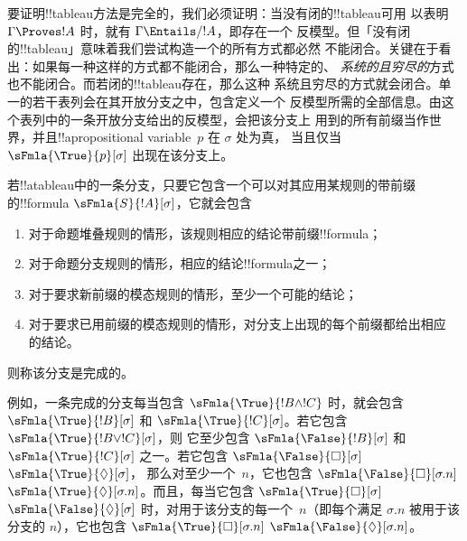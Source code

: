 \documentclass[../../../include/open-logic-section]{subfiles}
\begin{document}


\begin{explain}
  要证明!!{tableau}方法是完全的，我们必须证明：当没有闭的!!{tableau}可用
  以表明 $\Gamma \Proves !A$ 时，就有 $\Gamma \Entails/ !A$，即存在一个
  反模型。但「没有闭的!!{tableau}」意味着我们尝试构造一个的所有方式都必然
  不能闭合。关键在于看出：如果每一种这样的方式都不能闭合，那么一种特定的、
  \emph{系统的且穷尽的}方式也不能闭合。而若闭的!!{tableau}存在，那么这种
  系统且穷尽的方式就会闭合。单一的若干表列会在其开放分支之中，包含定义一个
  反模型所需的全部信息。由这个表列中的一条开放分支给出的反模型，会把该分支上
  用到的所有前缀当作世界，并且!!a{propositional variable}~$p$ 在 $\sigma$ 处为真，
  当且仅当 $\sFmla{\True}{p}[\sigma]$ 出现在该分支上。
\end{explain}

\begin{defn}
  若!!a{tableau}中的一条分支，只要它包含一个可以对其应用某规则的带前缀的!!{formula} $\sFmla{S}{!A}[\sigma]$，它就会包含
  \begin{enumerate}
    \item 对于命题堆叠规则的情形，该规则相应的结论带前缀!!{formula}；
    \item 对于命题分支规则的情形，相应的结论!!{formula}之一；
    \item 对于要求新前缀的模态规则的情形，至少一个可能的结论；
    \item 对于要求已用前缀的模态规则的情形，对分支上出现的每个前缀都给出相应
      的结论。
  \end{enumerate}
  则称该分支是完成的。
\end{defn}

\begin{explain}
  例如，一条完成的分支每当包含 $\sFmla{\True}{!B
  \land !C}$ 时，就会包含 $\sFmla{\True}{!B}[\sigma]$
  和 $\sFmla{\True}{!C}[\sigma]$。若它包含 $\sFmla{\True}{!B \lor !C}[\sigma]$，则
  它至少包含 $\sFmla{\False}{!B}[\sigma]$ 和
  $\sFmla{\True}{!C}[\sigma]$ 之一。若它包含 
  {$\sFmla{\False}{\Box}[\sigma]$} {$\sFmla{\True}{\Diamond}[\sigma]$}，
  那么对至少一个~$n$，它也包含  {$\sFmla{\False}{\Box}[\sigma.n]$}
  {$\sFmla{\True}{\Diamond}[\sigma.n]$}。而且，每当它包含 
  {$\sFmla{\True}{\Box}[\sigma]$}
  {$\sFmla{\False}{\Diamond}[\sigma]$} 时，对用于该分支的每一个~$n$（即每个满足
  $\sigma.n$ 被用于该分支的 $n$），它也包含 
  {$\sFmla{\True}{\Box}[\sigma.n]$}
  {$\sFmla{\False}{\Diamond}[\sigma.n]$}。
\end{explain}
\end{document}

